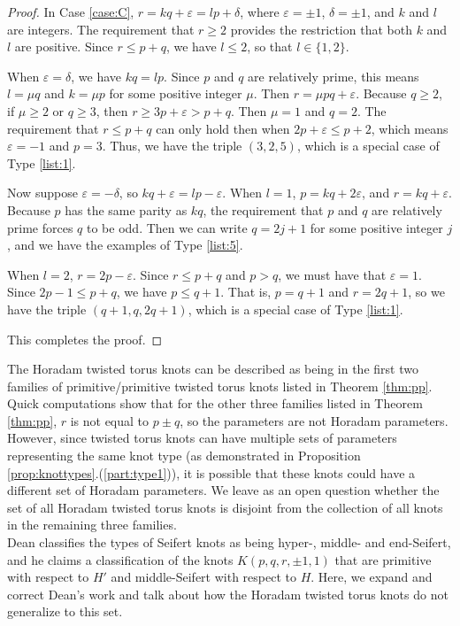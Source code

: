 \documentclass{amsart}
\newcommand{\eps}{\varepsilon}
\begin{document}
\begin{proof}
In Case \ref{case:C}, $r = kq + \eps = lp + \delta $, where $\eps = \pm 1$, $\delta = \pm 1$, and $k$ and $l$ are integers. The requirement that $r \ge 2$ provides the restriction that both $k$ and $l$ are positive. Since $r \le p+q$, we have $l \le 2$, so that $l \in \{1,2\}$. 

When $\eps = \delta$, we have $kq = lp$. Since $p$ and $q$ are relatively prime, this means $ l = \mu q$ and $k = \mu p$ for some positive integer $\mu$. Then $r = \mu p q + \eps$. Because $q \ge 2$, if $\mu \ge 2$ or $q \ge 3$, then $r \ge 3p + \eps > p+ q$. Then $\mu = 1$ and $q = 2$. The requirement that $r \le p+q$ can only hold then when  $2p+ \eps \le p + 2$, which means $\eps = -1$ and $p = 3$. Thus, we have the triple $(3, 2, 5)$, which is a special case of Type \ref{list:1}.

Now suppose $\eps = - \delta$, so $kq + \eps = lp - \eps$. When $l = 1$, $p= kq + 2\eps$, and $r = kq + \eps$. Because $p$ has the same parity as $kq$, the requirement that $p$ and $q$ are relatively prime forces $q$ to be odd. Then we can write $q = 2j + 1$ for some positive integer $j$, and we have the examples of Type \ref{list:5}. 

When $l = 2$, $r = 2p - \eps$. Since $r \le p+q$ and $p >q$, we must have that $\eps = 1$. Since $2p -1 \le p+q$, we have $p \le q+1$. That is, $p = q+1$ and $r = 2q+1$, so we have the triple $(q+1, q, 2q+1)$, which is a special case of Type \ref{list:1}.

This completes the proof.
\end{proof}

\vspace{.1in}

 The Horadam twisted torus knots can be described as being in the first two families of primitive/primitive twisted torus knots listed in Theorem \ref{thm:pp}. Quick computations show that for the other three families listed in Theorem \ref{thm:pp}, $r$ is not equal to $p \pm q$, so the parameters are not Horadam parameters. However, since twisted torus knots can have multiple sets of parameters representing the same knot type (as demonstrated in Proposition \ref{prop:knottypes}.(\ref{part:type1})), it is possible that these knots could have a different set of Horadam parameters. We leave as an open question whether the set of all Horadam twisted torus knots is disjoint from the collection of all knots in the remaining three families. \\
 
Dean \cite{DeanSFSSurgeries} classifies the types of Seifert knots as being hyper-, middle- and end-Seifert, and he claims a classification of the knots $K(p,q,r,\pm 1, 1)$ that are primitive with respect to $H'$ and middle-Seifert with respect to $H$. Here, we expand and correct Dean's work and talk about how the Horadam twisted torus knots do not generalize to this set.
\end{document}
